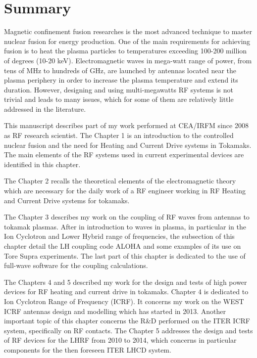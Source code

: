 \chapter*{Summary}

Magnetic confinement fusion researches is the most advanced technique to master nuclear fusion for energy production. One of the main requirements for achieving fusion is to heat the plasma particles to temperatures exceeding 100-200 million of degrees (10-20 keV). Electromagnetic waves in mega-watt range of power, from tens of MHz to hundreds of GHz, are launched by antennas located near the plasma periphery in order to increase the plasma temperature and extend its duration. However, designing and using multi-megawatts RF systems is not trivial and leads to many issues, which for some of them  are relatively little addressed in the literature. 

This manuscript describes part of my work performed at CEA/IRFM since 2008 as RF research scientist. The Chapter 1 is an introduction to the controlled nuclear fusion and the need for Heating and Current Drive systems in Tokamaks. The main elements of the RF systems used in current experimental devices are identified in this chapter. 

The Chapter 2 recalls the theoretical elements of the electromagnetic theory which are necessary for the daily work of a RF engineer working in RF Heating and Current Drive systems for tokamaks. 

The Chapter 3 describes my work on the coupling of RF waves from antennas to tokamak plasmas. After in introduction to waves in plasma, in particular in the Ion Cyclotron and Lower Hybrid range of frequencies, the subsection of this chapter detail the LH coupling code ALOHA and some examples of its use on Tore Supra experiments. The last part of this chapter is dedicated to the use of full-wave software for the coupling calculations.

The Chapters 4 and 5 described my work for the design and tests of high power devices for RF heating and current drive in tokamaks. Chapter 4 is dedicated to Ion Cyclotron Range of Frequency (ICRF). It concerns my work on the WEST ICRF antennas design and modelling which has started in 2013. Another important topic of this chapter concerns the R\&D performed on the ITER ICRF system, specifically on RF contacts. The Chapter 5 addresses the design and tests of RF devices for the LHRF from 2010 to 2014, which concerns in particular components for the then foreseen ITER LHCD system.

